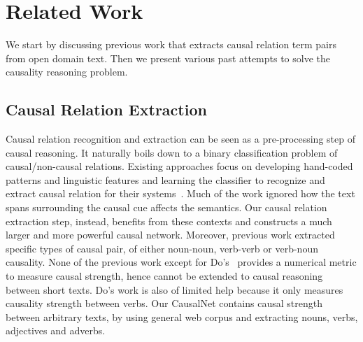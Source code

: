 \section{Related Work}
\label{sec:related}

We start by discussing previous work that extracts causal relation term
pairs from open domain text. Then we present various past attempts to 
solve the causality reasoning problem.

\subsection{Causal Relation Extraction}
Causal relation recognition and extraction
can be seen as a pre-processing step of causal reasoning.
It naturally boils down to a binary classification problem of
causal/non-causal relations. Existing approaches focus on developing
hand-coded patterns and linguistic features and learning the
classifier to recognize and extract causal relation for their
systems~\cite{girju2003automatic,ChangC04,blanco2008causal}. 
Much of the work ignored how the text spans surrounding the causal cue
affects the semantics. Our causal relation extraction
step, instead,  benefits from these contexts and
constructs a much larger and more powerful causal network.
Moreover, previous work 
extracted specific types of causal pair, of either noun-noun, verb-verb or verb-noun
\cite{do2011minimally,riaz2014recognizing} 
causality. None of the previous work except for 
Do's~ 
provides a numerical metric to measure causal strength, 
hence cannot be extended to causal reasoning between short texts. 
Do's work is also of limited help because it only
measures causality strength between verbs. 
Our CausalNet contains causal strength between arbitrary texts, by using general web corpus and
extracting nouns, verbs, adjectives and
adverbs.

